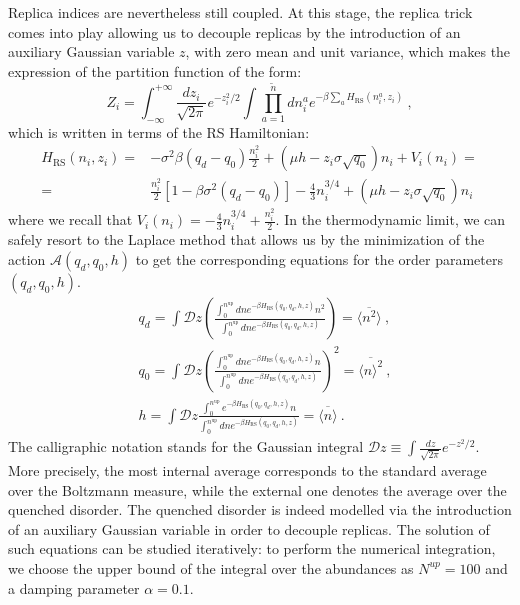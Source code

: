 \documentclass[12pt]{article}
\begin{document}
Replica indices are nevertheless still coupled. 
At this stage, the replica trick comes into play allowing us to decouple replicas by the introduction of an auxiliary Gaussian variable $z$, with zero mean and unit variance, which makes the expression of the partition function of the form:
\begin{equation}
    Z_i= \int_{-\infty}^{+\infty} \frac{d z_i}{\sqrt{2 \pi}} e^{-z_i^2/2} \int \prod \limits_{a=1}^{\tilde{n}} d n_i^a e^{-\beta \sum \limits_a H_\text{RS}(n_i^a, z_i) } \ ,
\end{equation}
which is written in terms of the RS Hamiltonian:
\begin{equation}
\begin{split}
    H_\text{RS}(n_i,z_i)=& - \sigma^2 \beta (q_d-q_0) \frac{n_i^2}{2} +( \mu h - z_i \sigma \sqrt{q_0})n_i +V_i(n_i)=\\
    =&\frac{n_i^2}{2} \left[1-\beta \sigma^2(q_d-q_0) \right] -\frac{4}{3} n_i^{3/4}+(\mu h-z_i \sigma \sqrt{q_0})n_i
   \end{split} 
\end{equation}
where we recall that $V_i(n_i)=-\frac{4}{3} n_i^{3/4} +\frac{n_i^2}{2}$. 
In the thermodynamic limit, we can safely resort to the Laplace method that allows us by the minimization of the action $\mathcal{A}(q_d,q_0,h)$ to get the corresponding equations for the order parameters $(q_d,q_0,h)$.
\begin{equation}
\begin{split}
& q_d= \int \mathcal{D} z \left(\frac{ \int_{0}^{n^{\text{up}}} d n e^{-\beta H_{\text{RS}}(q_0,q_d,h,z)} n^2}{ \int_{0}^{n^{\text{up}}} d n e^{-\beta H_{\text{RS}}(q_0,q_d,h,z)}} \right) = \overline{\langle  n^2 \rangle} \ , \\ 
& q_0= \int \mathcal{D} z \left(\frac{ \int_{0}^{n^{\text{up}}} d n e^{-\beta H_{\text{RS}}(q_0,q_d,h,z)} n}{ \int_{0}^{n^{\text{up}}} d n e^{-\beta H_{\text{RS}}(q_0,q_d,h,z)}} \right)^2  = \overline{ \langle n \rangle^2}  \ , \\ 
& h= \int \mathcal{D} z \frac{ \int_{0}^{n^{\text{up}}} e^{-\beta H_{\text{RS}}(q_0,q_d,h,z)} n}{ \int_{0}^{n^{\text{up}}} d n e^{-\beta H_{\text{RS}}(q_0,q_d,h,z)}}=\overline{ \langle  n \rangle} \ .
\label{equations_SP}
\end{split}
\end{equation}
The calligraphic notation stands for the Gaussian integral $\mathcal{D}z \equiv \int \frac{dz}{\sqrt{2 \pi}} e^{-z^2/2}$. More precisely, the most internal average corresponds to the standard average over the Boltzmann measure, while the external one denotes the average over the quenched disorder. The quenched disorder is indeed modelled via the introduction of an auxiliary Gaussian variable in order to decouple replicas. 
The solution of such equations can be studied iteratively: to perform the numerical integration, we choose the upper bound of the integral over the abundances as $N^{up}=100$ and a damping parameter $\alpha=0.1$.
\end{document}
